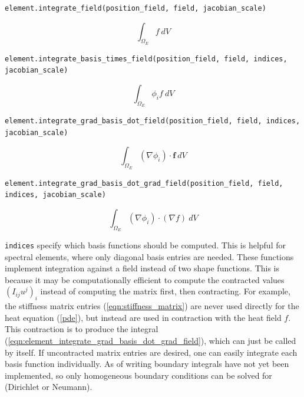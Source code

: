 \begin{verbatim}
element.integrate_field(position_field, field, jacobian_scale)
\end{verbatim}

\begin{equation}
\int_{\Omega_E} f~dV
\label{eqn:element_integrate_field}
\end{equation}

\begin{verbatim}
element.integrate_basis_times_field(position_field, field, indices, jacobian_scale)
\end{verbatim}

\begin{equation}
\int_{\Omega_E} \phi_i f~dV
\label{eqn:element_integrate_basis_times_field}
\end{equation}

\begin{verbatim}
element.integrate_grad_basis_dot_field(position_field, field, indices, jacobian_scale)
\end{verbatim}

\begin{equation}
\int_{\Omega_E} (\nabla \phi_i)\cdot \mathbf{f}~dV
\label{eqn:element_integrate_grad_basis_dot_field}
\end{equation}

\begin{verbatim}
element.integrate_grad_basis_dot_grad_field(position_field, field, indices, jacobian_scale)
\end{verbatim}

\begin{equation}
\int_{\Omega_E} (\nabla \phi_i)\cdot (\nabla f)~dV
\label{eqn:element_integrate_grad_basis_dot_grad_field}
\end{equation}

\verb+indices+ specify which basis functions should be computed. This is helpful for spectral elements, where only diagonal basis entries are needed. These functions implement integration against a field instead of two shape functions. This is because it may be computationally efficient to compute the contracted values $(I_{ij}u^j)_i$ instead of computing the matrix first, then contracting. For example, the stiffness matrix entries (\ref{eqn:stiffness_matrix}) are never used directly for the heat equation (\ref{pde}), but instead are used in contraction with the heat field $f$. This contraction is to produce the integral (\ref{eqn:element_integrate_grad_basis_dot_grad_field}), which can just be called by itself. If uncontracted matrix entries are desired, one can easily integrate each basis function individually. As of writing boundary integrals have not yet been implemented, so only homogeneous boundary conditions can be solved for (Dirichlet or Neumann).

